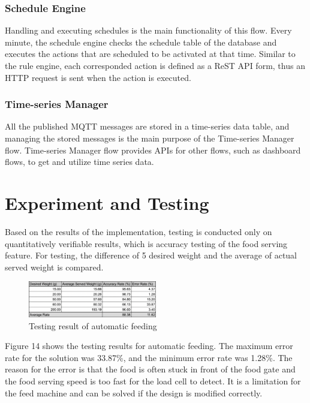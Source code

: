 ﻿\documentclass[conference]{IEEEtran}
\begin{document}
\subsubsection{Schedule Engine}
Handling and executing schedules is the main functionality of this flow.
Every minute, the schedule engine checks the schedule table of the database and executes the actions that are scheduled to be activated at that time.
Similar to the rule engine, each corresponded action is defined as a ReST API form, thus an HTTP request is sent when the action is executed.

\subsubsection{Time-series Manager}
All the published MQTT messages are stored in a time-series data table, and managing the stored messages is the main purpose of the Time-series Manager flow.
Time-series Manager flow provides APIs for other flows, such as dashboard flows, to get and utilize time series data.

\section{Experiment and Testing}
Based on the results of the implementation, testing is conducted only on quantitatively verifiable results, which is accuracy testing of the food serving feature.
For testing, the difference of 5 desired weight and the average of actual served weight is compared.

\begin{figure}[htbp]
\centerline{\includegraphics[width=0.5\textwidth]{./images/serve-accuracy.png}}
\caption{Testing result of automatic feeding}
\label{fig}
\end{figure}

Figure 14 shows the testing results for automatic feeding.
The maximum error rate for the solution was 33.87\%, and the minimum error rate was 1.28\%.
The reason for the error is that the food is often stuck in front of the food gate and the food serving speed is too fast for the load cell to detect.
It is a limitation for the feed machine and can be solved if the design is modified correctly.
\end{document}
